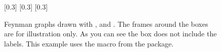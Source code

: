 %       
%         
\begin{figure}[htbp]
  \centering
    [0.3\textwidth]{
  }
  \subcaptionbox{\TikZ\label{fig:feyn:tikz}}
    [0.3\textwidth]{\fbox{%
    }
  }
    [0.3\textwidth]{}
  \caption{Feynman graphs drawn with ,  and .
    The frames around the boxes are for illustration only.
    As you can see the  box does not include the labels.
    This example uses the  macro from the  package.}%
  \label{fig:feyn:cf}
\end{figure}


